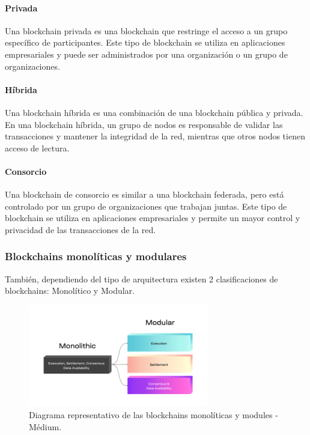     \paragraph{Privada}
    Una blockchain privada es una blockchain que restringe el acceso a un grupo específico de participantes. Este tipo de blockchain se utiliza en aplicaciones empresariales y puede ser administrados por una organización o un grupo de organizaciones.
    
    \paragraph{Híbrida}
    Una blockchain híbrida es una combinación de una blockchain pública y privada. En una blockchain híbrida, un grupo de nodos es responsable de validar las transacciones y mantener la integridad de la red, mientras que otros nodos tienen acceso de lectura.
    
    \paragraph{Consorcio}
    Una blockchain de consorcio es similar a una blockchain federada, pero está controlado por un grupo de organizaciones que trabajan juntas. Este tipo de blockchain se utiliza en aplicaciones empresariales y permite un mayor control y privacidad de las transacciones de la red.

\newpage

\subsubsection{Blockchains monolíticas y modulares}

También, dependiendo del tipo de arquitectura existen 2 clasificaciones de blockchains: Monolítico y Modular.

\begin{figure}[H]
        \centering
        \includegraphics[width=0.7\textwidth]{img/capturas/monovsmodu.png}
        \caption{Diagrama representativo de las blockchains monolíticas y modules - Médium.}
        \label{fig:configApi}
\end{figure}

